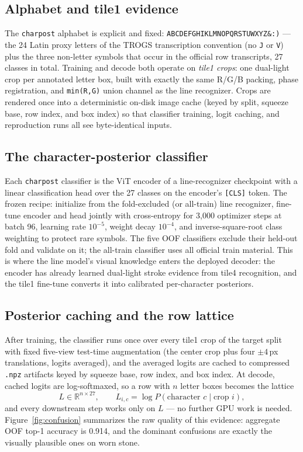 \documentclass[11pt]{article}
\newcommand{\charpost}{\texttt{charpost}}
\begin{document}
\subsection{Alphabet and tile1 evidence}
The \charpost{} alphabet is explicit and fixed:
\texttt{ABCDEFGHIKLMNOPQRSTUWXYZ\&:)} --- the 24 Latin proxy letters of the TROGS transcription
convention (no \texttt{J} or \texttt{V}) plus the three non-letter symbols that occur in the
official row transcripts, 27 classes in total. Training and decode both operate on \emph{tile1
crops}: one dual-light crop per annotated letter box, built with exactly the same R/G/B packing,
phase registration, and \texttt{min(R,G)} union channel as the line recognizer. Crops are rendered
once into a deterministic on-disk image cache (keyed by split, squeeze base, row index, and box
index) so that classifier training, logit caching, and reproduction runs all see byte-identical
inputs.

\subsection{The character-posterior classifier}
Each \charpost{} classifier is the ViT encoder of a line-recognizer checkpoint with a linear
classification head over the 27 classes on the encoder's \texttt{[CLS]} token. The frozen recipe:
initialize from the fold-excluded (or all-train) line recognizer, fine-tune encoder and head
jointly with cross-entropy for 3{,}000 optimizer steps at batch 96, learning rate $10^{-5}$,
weight decay $10^{-4}$, and inverse-square-root class weighting to protect rare symbols. The five
OOF classifiers exclude their held-out fold and validate on it; the all-train classifier uses all
official train material. This is where the line model's visual knowledge enters the deployed
decoder: the encoder has already learned dual-light stroke evidence from tile4 recognition, and
the tile1 fine-tune converts it into calibrated per-character posteriors.

\subsection{Posterior caching and the row lattice}
After training, the classifier runs once over every tile1 crop of the target split with fixed
five-view test-time augmentation (the center crop plus four $\pm4$\,px translations, logits
averaged), and the averaged logits are cached to compressed \texttt{.npz} artifacts keyed by
squeeze base, row index, and box index. At decode, cached logits are log-softmaxed, so a row with
$n$ letter boxes becomes the lattice
\[
  L \in \mathbb{R}^{n \times 27}, \qquad
  L_{i,c} = \log P(\text{character } c \mid \text{crop } i),
\]
and every downstream step works only on $L$ --- no further GPU work is needed.
Figure~\ref{fig:confusion} summarizes the raw quality of this evidence: aggregate OOF top-1
accuracy is 0.914, and the dominant confusions are exactly the visually plausible ones on worn
stone.
\end{document}

